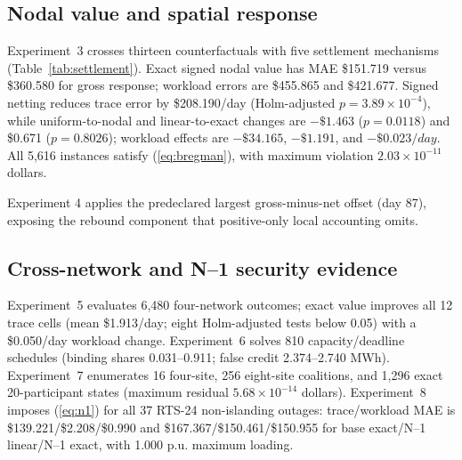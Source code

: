 \documentclass[10pt,journal]{IEEEtran}
\begin{document}
\subsection{Nodal value and spatial response}

Experiment~3 crosses thirteen counterfactuals with five settlement mechanisms
(Table~\ref{tab:settlement}). Exact signed nodal value has MAE \$151.719 versus
\$360.580 for gross response; workload errors are \$455.865 and \$421.677.
Signed netting reduces trace error by \$208.190/day (Holm-adjusted
$p=3.89\times10^{-4}$), while uniform-to-nodal and linear-to-exact changes are
$-\$1.463$ ($p=0.0118$) and \$0.671 ($p=0.8026$); workload effects are
$-\$34.165$, $-\$1.191$, and $-\$0.023/day$. All 5,616 instances satisfy
(\ref{eq:bregman}), with maximum violation $2.03\times10^{-11}$ dollars.

\begin{table}[t]
\centering
\caption{Base-case and complete N--1 settlement errors (USD/day).}
\label{tab:settlement}
\scriptsize
{}
\end{table}

Experiment 4 applies the predeclared largest gross-minus-net offset (day 87),
exposing the rebound component that positive-only local accounting omits.

\subsection{Cross-network and N--1 security evidence}

Experiment~5 evaluates 6,480 four-network outcomes; exact value improves all
12 trace cells (mean \$1.913/day; eight Holm-adjusted tests below 0.05) with a
\$0.050/day workload change. Experiment~6 solves 810 capacity/deadline schedules
(binding shares 0.031--0.911; false credit 2.374--2.740 MWh). Experiment~7
enumerates 16 four-site, 256 eight-site coalitions, and 1,296 exact
20-participant states (maximum residual $5.68\times10^{-14}$ dollars).
Experiment~8 imposes (\ref{eq:n1}) for all 37 RTS-24 non-islanding outages:
trace/workload MAE is \$139.221/\$2.208/\$0.990 and
\$167.367/\$150.461/\$150.955 for base exact/N--1 linear/N--1 exact, with
1.000 p.u. maximum loading.
\end{document}
